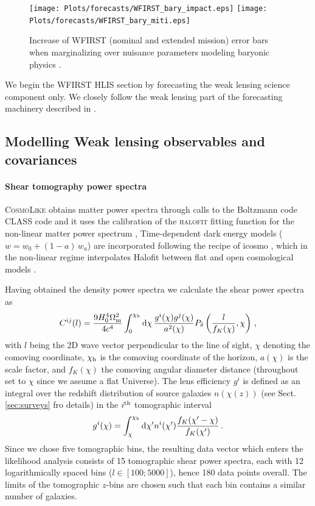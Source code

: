 \begin{figure}
\texttt{[image: Plots/forecasts/WFIRST\_bary\_impact.eps]}
\texttt{[image: Plots/forecasts/WFIRST\_bary\_miti.eps]}
\caption{Increase of WFIRST (nominal and extended mission) error bars when marginalizing over nuisance parameters modeling baryonic physics \citep[see][for details of the method]{ekd15}.}
         \label{fi:bary}
\end{figure}

We begin the WFIRST HLIS section by forecasting the weak lensing science component only. We closely follow the weak lensing part of the forecasting machinery described in \cite{Krause17}. 

\subsection{Modelling Weak lensing observables and covariances}
\label{sec:lensingbasics}

\paragraph*{Shear tomography power spectra}
\textsc{CosmoLike} obtains matter power spectra through calls to the Boltzmann code \textsc{CLASS} code \citep{CLASS}and it uses the \citet{tsn12} calibration of the \textsc{halofit} fitting function for the non-linear matter power spectrum \citep{smp03}, Time-dependent dark energy models ($w=w_0+(1-a)\,w_a$) are incorporated following the recipe of {\sc icosmo} \citep{rak11}, which in the non-linear regime interpolates Halofit between flat and open cosmological models \citep[also see][for more details]{shj10}.

Having obtained the density power spectra we calculate the shear power spectra as
\begin{equation}
\label{eq:pdeltatopkappa}
C ^{ij} (l) = \frac{9H_0^4 \om^2}{4c^4} \int_0^{\chi_\mr h} 
\mr d \chi \, \frac{g^{i}(\chi) g^{j}(\chi)}{a^2(\chi)} \pd \left(\frac{l}{f_K(\chi)},\chi \right) \,,
\end{equation}
with $l$ being the 2D wave vector perpendicular to the line of sight, $\chi$ denoting the comoving coordinate, $\chi_\mathrm h$ is the comoving coordinate of the horizon, $a(\chi)$ is the scale factor, and $f_K(\chi)$ the comoving angular diameter distance (throughout set to $\chi$ since we assume a flat Universe). The lens efficiency $g^{i}$ is defined as an integral over the redshift distribution of source galaxies $n(\chi(z))$ (see Sect. \ref{sec:surveys} fro details) in the $i^\mathrm{th}$ tomographic interval
\begin{equation}
\label{eq:redshift_distri}
g^{i}(\chi) = \int_\chi^{\chi_{\mr h}} \mr d \chi' n^{i} (\chi') \frac{f_K (\chi'-\chi)}{f_K (\chi')} \,.
\end{equation}
Since we chose five tomographic bins, the resulting data vector which enters the likelihood analysis consists of 15 tomographic shear power spectra, each with 12 logarithmically spaced bins ($l \in [100;5000]$), hence 180 data points overall. The limits of the tomographic $z$-bins are chosen such that each bin contains a similar number of galaxies.


